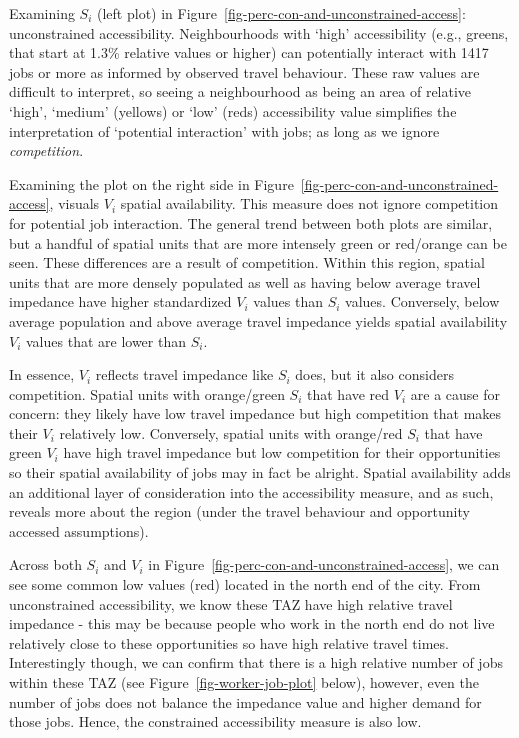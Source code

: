 \documentclass[12pt, oneside]{report}
\begin{document}
Examining \(S_i\) (left plot) in
Figure~\ref{fig-perc-con-and-unconstrained-access}: unconstrained
accessibility. Neighbourhoods with `high' accessibility (e.g., greens,
that start at 1.3\% relative values or higher) can potentially interact
with 1417 jobs or more as informed by observed travel behaviour. These
raw values are difficult to interpret, so seeing a neighbourhood as
being an area of relative `high', `medium' (yellows) or `low' (reds)
accessibility value simplifies the interpretation of `potential
interaction' with jobs; as long as we ignore \emph{competition}.

Examining the plot on the right side in
Figure~\ref{fig-perc-con-and-unconstrained-access}, visuals \(V_i\)
spatial availability. This measure does not ignore competition for
potential job interaction. The general trend between both plots are
similar, but a handful of spatial units that are more intensely green or
red/orange can be seen. These differences are a result of competition.
Within this region, spatial units that are more densely populated as
well as having below average travel impedance have higher standardized
\(V_i\) values than \(S_i\) values. Conversely, below average population
and above average travel impedance yields spatial availability \(V_i\)
values that are lower than \(S_i\).

In essence, \(V_i\) reflects travel impedance like \(S_i\) does, but it
also considers competition. Spatial units with orange/green \(S_i\) that
have red \(V_i\) are a cause for concern: they likely have low travel
impedance but high competition that makes their \(V_i\) relatively low.
Conversely, spatial units with orange/red \(S_i\) that have green
\(V_i\) have high travel impedance but low competition for their
opportunities so their spatial availability of jobs may in fact be
alright. Spatial availability adds an additional layer of consideration
into the accessibility measure, and as such, reveals more about the
region (under the travel behaviour and opportunity accessed
assumptions).

Across both \(S_i\) and \(V_i\) in
Figure~\ref{fig-perc-con-and-unconstrained-access}, we can see some
common low values (red) located in the north end of the city. From
unconstrained accessibility, we know these TAZ have high relative travel
impedance - this may be because people who work in the north end do not
live relatively close to these opportunities so have high relative
travel times. Interestingly though, we can confirm that there is a high
relative number of jobs within these TAZ (see
Figure~\ref{fig-worker-job-plot} below), however, even the number of
jobs does not balance the impedance value and higher demand for those
jobs. Hence, the constrained accessibility measure is also low.
\end{document}

